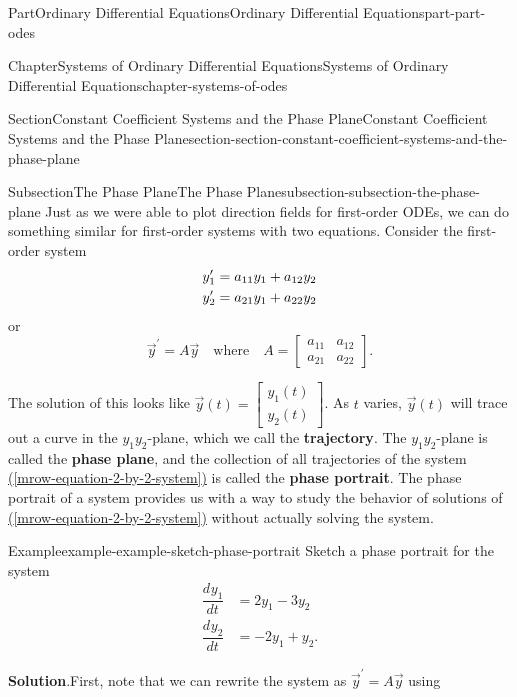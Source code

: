 \documentclass[twoside,10pt,]{book}
\newcommand{\blocktitlefont}{\relax}
\newcommand{\xreffont}{\relax}
\newcommand{\terminology}[1]{\textbf{#1}}
\numberwithin{equation}{part}
\newcommand{\dv}[3][]{\dfrac{d^{#1} #2}{d #3^{#1}}}
\begin{document}
\begin{partptx}{Part}{Ordinary Differential Equations}{}{Ordinary Differential Equations}{}{}{part-part-odes}
\begin{chapterptx}{Chapter}{Systems of Ordinary Differential Equations}{}{Systems of Ordinary Differential Equations}{}{}{chapter-systems-of-odes}
\begin{sectionptx}{Section}{Constant Coefficient Systems and the Phase Plane}{}{Constant Coefficient Systems and the Phase Plane}{}{}{section-section-constant-coefficient-systems-and-the-phase-plane}
\typeout{************************************************}
%
\begin{subsectionptx}{Subsection}{The Phase Plane}{}{The Phase Plane}{}{}{subsection-subsection-the-phase-plane}
Just as we were able to plot direction fields for first-order ODEs, we can do something similar for first-order systems with two equations. Consider the first-order system%
\begin{align}
y^\prime_{1}  & =  a_{11}y_{1} + a_{12}y_{2}\label{mrow-equation-2-by-2-system}\\
y^\prime_{2}  & =  a_{21}y_{1}+  a_{22}y_{2}\notag
\end{align}
or%
\begin{equation*}
\vec{y}^\prime = A\vec{y}\quad\text{where}\quad A = \begin{bmatrix}a_{11}  &  a_{12}  \\  a_{21}  &  a_{22}\end{bmatrix}.
\end{equation*}
%
\par
The solution of this looks like \(\vec{y}(t) = \begin{bmatrix}y_{1}(t) \\ y_{2}(t)\end{bmatrix}\). As \(t\) varies, \(\vec{y}(t)\) will trace out a curve in the \(y_{1}y_{2}\)-plane, which we call the \terminology{trajectory}. The \(y_{1}y_{2}\)-plane is called the \terminology{phase plane}, and the collection of all trajectories of the system \hyperref[mrow-equation-2-by-2-system]{({\xreffont\ref{mrow-equation-2-by-2-system}})} is called the \terminology{phase portrait}. The phase portrait of a system provides us with a way to study the behavior of solutions of \hyperref[mrow-equation-2-by-2-system]{({\xreffont\ref{mrow-equation-2-by-2-system}})} without actually solving the system.%
\begin{example}{Example}{}{example-example-sketch-phase-portrait}%
Sketch a phase portrait for the system%
\begin{align*}
\dv{y_{1}}{t}  & =  2y_{1} - 3y_{2}\\
\dv{y_{2}}{t}  & =  -2y_{1} + y_{2}.
\end{align*}
%
\par\smallskip%
\noindent\textbf{\blocktitlefont Solution}.\hypertarget{solution-example-sketch-phase-portrait-b}{}\quad{}First, note that we can rewrite the system as \(\vec{y}^\prime = A\vec{y}\) using%
\begin{equation*}

\end{equation*}
\end{example}
\end{subsectionptx}
\end{sectionptx}
\end{chapterptx}
\end{partptx}
\end{document}
